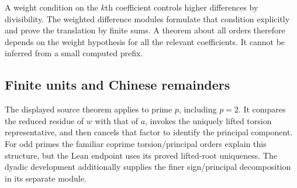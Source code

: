 A weight condition on the $k$th coefficient controls higher differences by divisibility. The weighted difference modules formulate that condition explicitly and prove the translation by finite sums. A theorem about all orders therefore depends on the weight hypothesis for all the relevant coefficients. It cannot be inferred from a small computed prefix.

\subsection{Finite units and Chinese remainders}
The displayed source theorem applies to prime $p$, including $p=2$. It compares the reduced residue of $w$ with that of $a$, invokes the uniquely lifted torsion representative, and then cancels that factor to identify the principal component. For odd primes the familiar coprime torsion/principal orders explain this structure, but the Lean endpoint uses its proved lifted-root uniqueness. The dyadic development additionally supplies the finer sign/principal decomposition in its separate module.

